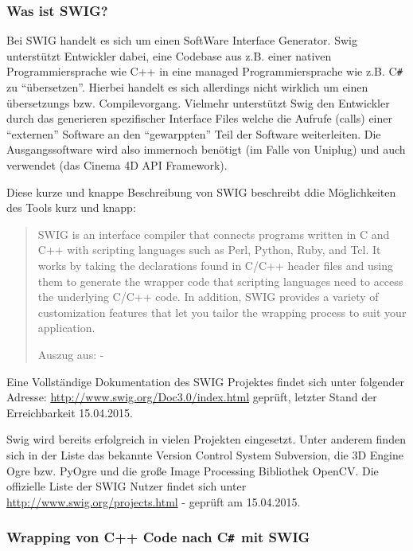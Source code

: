 \documentclass[pagesize, paper=a4, fontsize=12pt,titlepage=true, headings=small, headnosepline, abstractoff, liststotoc, nochapterprefix, plainheadsepline, twoside]{scrreprt}
\newcommand{\CSS}{C\texttt{\# }}
\begin{document}
\subsubsection{Was ist SWIG?}
Bei SWIG handelt es sich um einen SoftWare Interface Generator. Swig unterstützt Entwickler dabei, eine Codebase aus z.B. einer nativen Programmiersprache wie C++ in eine managed Programmiersprache wie z.B. \CSS zu “übersetzen”. Hierbei handelt es sich allerdings nicht wirklich um einen übersetzungs bzw. Compilevorgang. Vielmehr unterstützt Swig den Entwickler durch das generieren spezifischer Interface Files welche die Aufrufe (calls) einer “externen” Software an den “gewarppten” Teil der Software weiterleiten. Die Ausgangssoftware wird also immernoch benötigt (im Falle von Uniplug) und auch verwendet (das Cinema 4D API Framework).

Diese kurze und knappe Beschreibung von SWIG beschreibt ddie Möglichkeiten des Tools kurz und knapp:
\begin{quote}
SWIG is an interface compiler that connects programs written in C and C++ with scripting languages such as Perl, Python, Ruby, and Tcl. It works by taking the declarations found in C/C++ header files and using them to generate the wrapper code that scripting languages need to access the underlying C/C++ code. In addition, SWIG provides a variety of customization features that let you tailor the wrapping process to suit your application.

Auszug aus: - 
\end{quote}

Eine Vollständige Dokumentation des SWIG Projektes findet sich unter folgender Adresse: \url{http://www.swig.org/Doc3.0/index.html} geprüft, letzter Stand der Erreichbarkeit 15.04.2015.

Swig wird bereits erfolgreich in vielen Projekten eingesetzt. Unter anderem finden sich in der Liste das bekannte Version Control System Subversion, die 3D Engine Ogre bzw. PyOgre und die große Image Processing Bibliothek OpenCV. Die offizielle Liste der SWIG Nutzer findet sich unter \url{http://www.swig.org/projects.html} - geprüft am 15.04.2015.

\subsubsection{Wrapping von C++ Code nach \CSS mit SWIG}
\end{document}

